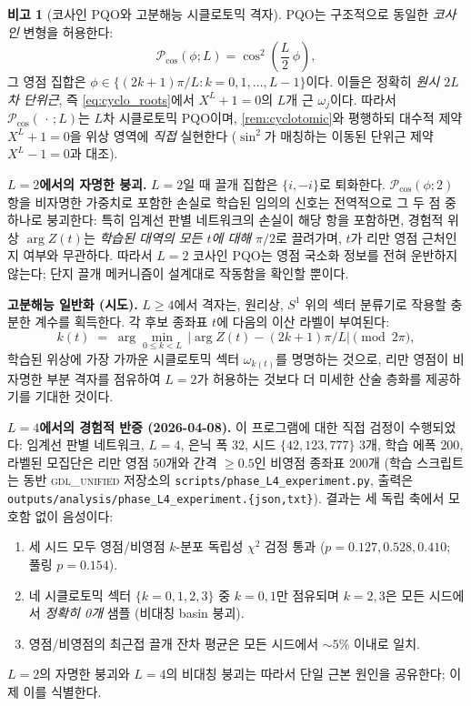 \documentclass[11pt, a4paper]{article}
\theoremstyle{definition}
\newtheorem{remark}{비고}[section]
\theoremstyle{plain}
\begin{document}
\begin{remark}[코사인 PQO와 고분해능 시클로토믹 격자]
\label{rem:cos2_pqo}
PQO는 구조적으로 동일한 \emph{코사인} 변형을 허용한다:
\begin{equation}
  \mathcal{P}_{\cos}(\phi; L) = \cos^2\!\left(\frac{L}{2}\,\phi\right),
  \label{eq:pqo_cos}
\end{equation}
그 영점 집합은 $\phi \in \{(2k+1)\pi/L : k = 0, 1, \ldots, L-1\}$이다. 이들은 정확히 \emph{원시 $2L$차 단위근}, 즉 \cref{eq:cyclo_roots}에서 $X^L + 1 = 0$의 $L$개 근 $\omega_j$이다. 따라서 $\mathcal{P}_{\cos}(\,\cdot\,; L)$는 $L$차 시클로토믹 PQO이며, \cref{rem:cyclotomic}와 평행하되 대수적 제약 $X^L + 1 = 0$을 위상 영역에 \emph{직접} 실현한다 ($\sin^2$가 매칭하는 이동된 단위근 제약 $X^L - 1 = 0$과 대조).

\smallskip\noindent\textbf{$L = 2$에서의 자명한 붕괴.} $L = 2$일 때 끌개 집합은 $\{i, -i\}$로 퇴화한다. $\mathcal{P}_{\cos}(\phi; 2)$ 항을 비자명한 가중치로 포함한 손실로 학습된 임의의 신호는 전역적으로 그 두 점 중 하나로 붕괴한다: 특히 임계선 판별 네트워크의 손실이 해당 항을 포함하면, 경험적 위상 $\arg Z(t)$는 \emph{학습된 대역의 모든 $t$에 대해} $\pi/2$로 끌려가며, $t$가 리만 영점 근처인지 여부와 무관하다. 따라서 $L = 2$ 코사인 PQO는 영점 국소화 정보를 전혀 운반하지 않는다; 단지 끌개 메커니즘이 설계대로 작동함을 확인할 뿐이다.

\smallskip\noindent\textbf{고분해능 일반화 (시도).} $L \geq 4$에서 격자는, 원리상, $S^1$ 위의 섹터 분류기로 작용할 충분한 계수를 획득한다. 각 후보 종좌표 $t$에 다음의 이산 라벨이 부여된다:
\begin{equation}
  k(t) \;=\; \arg\min_{0 \leq k < L}\,\big|\arg Z(t) - (2k{+}1)\pi/L\big|
  \pmod{2\pi},
  \label{eq:cyclo_label}
\end{equation}
학습된 위상에 가장 가까운 시클로토믹 섹터 $\omega_{k(t)}$를 명명하는 것으로, 리만 영점이 비자명한 부분 격자를 점유하여 $L=2$가 허용하는 것보다 더 미세한 산술 층화를 제공하기를 기대한 것이다.

\smallskip\noindent\textbf{$L = 4$에서의 경험적 반증 (2026-04-08).} 이 프로그램에 대한 직접 검정이 수행되었다: 임계선 판별 네트워크, $L=4$, 은닉 폭 $32$, 시드 $\{42, 123, 777\}$ 3개, 학습 에폭 $200$, 라벨된 모집단은 리만 영점 $50$개와 간격 $\geq 0.5$인 비영점 종좌표 $200$개 (학습 스크립트는 동반 \textsc{gdl\_unified} 저장소의 \texttt{scripts/phase\_L4\_experiment.py}, 출력은 \texttt{outputs/analysis/phase\_L4\_experiment.\{json,txt\}}). 결과는 세 독립 축에서 모호함 없이 음성이다:
\begin{enumerate}
  \item 세 시드 모두 영점/비영점 $k$-분포 독립성 $\chi^2$ 검정 통과 ($p = 0.127, 0.528, 0.410$; 풀링 $p = 0.154$).
  \item 네 시클로토믹 섹터 $\{k=0,1,2,3\}$ 중 $k=0,1$만 점유되며 $k=2,3$은 모든 시드에서 \emph{정확히 0개} 샘플 (비대칭 basin 붕괴).
  \item 영점/비영점의 최근접 끌개 잔차 평균은 모든 시드에서 $\sim 5\%$ 이내로 일치.
\end{enumerate}
$L=2$의 자명한 붕괴와 $L=4$의 비대칭 붕괴는 따라서 단일 근본 원인을 공유한다; 이제 이를 식별한다.


\end{remark}
\end{document}
